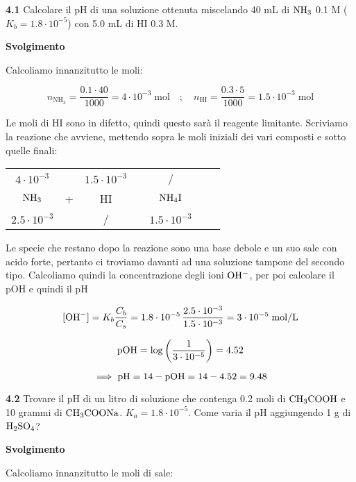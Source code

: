 \textbf{4.1} Calcolare il pH di una soluzione ottenuta miscelando 40 mL di $\rm NH_3$ 0.1 M ($K_b = 1.8 \cdot 10^{-5}$) con 5.0 mL di HI 0.3 M.

\vspace{0.2cm}\large\textbf{Svolgimento}\normalsize

\vspace{0.2cm}Calcoliamo innanzitutto le moli:

$$n_{\text{NH}_3}=\frac{0.1 \cdot 40}{1000}
=4 \cdot 10^{-3} \; \text{mol}
\quad ; \quad
n_{\text{HI}}=\frac{0.3 \cdot 5}{1000}
=1.5 \cdot 10^{-3} \;\text{mol}$$

Le moli di HI sono in difetto, quindi questo sarà il reagente limitante. Scriviamo la reazione che avviene, mettendo sopra le moli iniziali dei vari composti e sotto quelle finali:

\begin{center}
    \begin{tabular}{ccccccc}
        $4 \cdot 10^{-3}$ &  & $1.5 \cdot 10^{-3}$ & & /\\
        $\rm NH_3$ & + & HI & \ce{->} & $\rm NH_4I$ \\
        $2.5 \cdot 10^{-3}$ &  &  / & & $1.5 \cdot 10^{-3}$\\
    \end{tabular}
\end{center}

Le specie che restano dopo la reazione sono una base debole e un suo sale con acido forte, pertanto ci troviamo davanti ad una soluzione tampone del secondo tipo. Calcoliamo quindi la concentrazione degli ioni $\rm OH^-$, per poi calcolare il pOH e quindi il pH

$$[\text{OH}^-]=K_b\frac{C_b}{C_s}
=1.8 \cdot 10^{-5}\,\frac{2.5 \cdot 10^{-3}}{1.5 \cdot 10^{-3}}
= 3 \cdot 10^{-5} \; \rm mol/L$$

$$\rm pOH=\log\left(\frac{1}{3 \cdot 10^{-5}}\right)=4.52$$

$$\implies \rm pH=14-pOH=14-4.52=9.48$$

\vspace{0.2cm}\textbf{4.2} Trovare il pH di un litro di soluzione che contenga 0.2 moli di $\rm CH_3COOH$ e 10 grammi di $\rm CH_3COONa$. $K_a = 1.8 \cdot 10^{-5}$. Come varia il pH aggiungendo 1 g di $\rm H_2SO_4$?

\vspace{0.2cm}\large\textbf{Svolgimento}\normalsize

\vspace{0.2cm}Calcoliamo innanzitutto le moli di sale:


